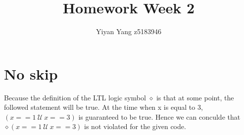 \documentclass[a4paper,12pt,oneside]{article}
\title{Homework Week 2}
\author{Yiyan Yang z5183946}
\begin{document}
    \setlength{\headheight}{14.49998pt}
    \addtolength{\topmargin}{-2.49998pt}
    \maketitle
    \thispagestyle{fancy}
    \section{No skip}
    Because the definition of the LTL logic symbol $\diamond$ is that at some point, 
    the followed statement will be true. 
    At the time when x is equal to 3, 
    $(x == 1\ \mathcal {U}\ x == 3)$ is guaranteed to be true.
    Hence we can conculde that $\diamond (x == 1\ \mathcal {U}\ x == 3)$ 
    is not violated for the given code.
    
\end{document}
